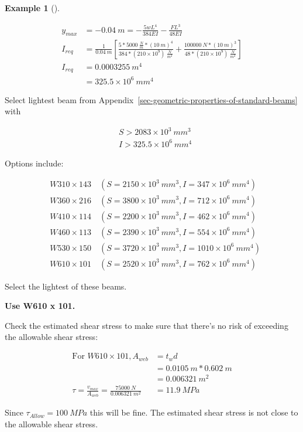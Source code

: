 \documentclass[
  letterpaper,
  DIV=11,
  numbers=noendperiod]{scrreprt}
\theoremstyle{definition}
\newtheorem{example}{Example}[chapter]
\theoremstyle{remark}
\begin{document}
\begin{tcolorbox}
\begin{example}[]
\begin{tcolorbox}
\[
\begin{aligned}
y_{max}&= -0.04{~m}=-\frac{5wL^4}{384EI}-\frac{FL^3}{48EI} \\
I_{req}&=\frac{1}{0.04{~m}}\left[\frac{5*5000~\frac{N}{m}*(10{~m})^4}{384*(210 \times 10^9)~\frac{N}{m^2}}+\frac{100000{~N}*(10{~m})^3}{48*(210 \times 10^9)~\frac{N}{m^2}}\right] \\
I_{req}&=0.0003255{~m}^4 \\
&= 325.5 \times 10^6{~mm}^4
\end{aligned}
\]

Select lightest beam from
Appendix~\ref{sec-geometric-properties-of-standard-beams} with

\[
\begin{aligned} 
& S>2083\times10^3{~mm}^3 \\ 
& I>325.5\times10^6 {~mm}^4
\end{aligned}
\]

Options include:

\[
\begin{aligned}&W310\times143\quad(S=2150\times10^3~mm^3,I=347\times10^6~mm^4)\\
&W360\times216\quad(S=3800\times10^3~mm^3,I=712\times10^6~mm^4)\\
&W410\times114\quad(S=2200\times10^3~mm^3,I=462\times10^6~mm^4)\\
&W460\times113\quad(S=2390\times10^3~mm^3,I=554\times10^6~mm^4)\\
&W530\times150\quad(S=3720\times10^3~mm^3,I=1010\times10^6~mm^4)\\
&W610\times101\quad(S=2520\times10^3~mm^3,I=762\times10^6~mm^4)\end{aligned}
\]

Select the lightest of these beams.

\textbf{Use W610 x 101.}

Check the estimated shear stress to make sure that there's no risk of
exceeding the allowable shear stress:

\[
\begin{aligned}
{\text{For }}W610\times 101, A_{web}&=t_w d \\
&=0.0105{~m}*0.602{~m} \\
&=0.006321{~m}^2 \\
\tau=\frac{v_{max}}{A_{web}}=\frac{75000{~N}}{0.006321{~m^2}}&=11.9{~MPa}
\end{aligned}
\]

Since \(\tau_{Allow}=100 ~MPa\) this will be fine. The estimated shear
stress is not close to the allowable shear stress.

\end{tcolorbox}

\end{example}

\end{tcolorbox}
\end{document}
